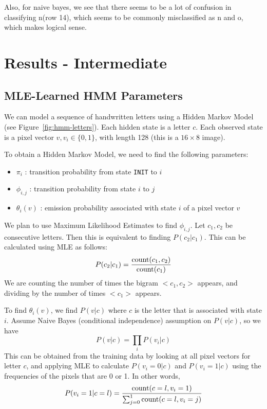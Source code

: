 \documentclass{article} %
\begin{document}
Also, for naive bayes, we see that there seems to be a lot of confusion in classifying n(row 14), which seems to be commonly misclassified as n and o, which makes logical sense. 


\section{Results - Intermediate}

\subsection{MLE-Learned HMM Parameters}

We can model a sequence of handwritten letters using a Hidden Markov Model (see Figure~\ref{fig:hmm-letters}). Each hidden state is a letter $c$. Each observed state is a pixel vector $v, v_i \in \{0,1\}$, with length 128 (this is a $16 \times 8$ image). 

To obtain a Hidden Markov Model, we need to find the following parameters:
\begin{itemize}
	\item $\pi_i$ : transition probability from state \texttt{INIT} to $i$
	\item $\phi_{i,j}$ : transition probability from state $i$ to $j$
	\item $\theta_{i}(v)$ : emission probability associated with state $i$ of a pixel vector $v$
\end{itemize}

We plan to use Maximum Likelihood Estimates to find $\phi_{i,j}$. Let $c_1, c_2$ be consecutive letters. Then this is equivalent to finding $P(c_2 | c_1)$. This can be calculated using MLE as follows:
$$ P(c_2 | c_1) = \frac{\mbox{count}(c_1, c_2)}{\mbox{count}(c_1)}$$
We are counting the number of times the bigram $<c_1, c_2>$ appears, and dividing by the number of times $<c_1>$ appears.

To find $\theta_{i}(v)$, we find $P(v | c)$ where $c$ is the letter that is associated with state $i$. Assume Naive Bayes (conditional independence) assumption on $P(v | c)$, so we have 
$$ P(v | c) = \prod_i P(v_i | c)$$
This can be obtained from the training data by looking at all pixel vectors for letter $c$, and applying MLE to calculate $P(v_i = 0 | c)$ and $P(v_i = 1 | c)$ using the frequencies of the pixels that are 0 or 1. In other words,
$$ P(v_i = 1 | c = l) = \frac{\mbox{count}(c = l, v_i = 1)}{\sum_{j=0}^1 \mbox{count}(c = l, v_i = j)}$$

\end{document}
